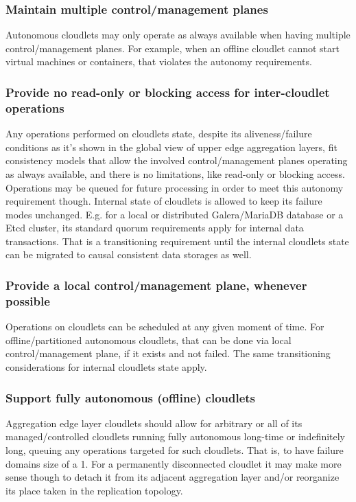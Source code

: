 \documentclass[conference]{IEEEtran}
\begin{document}
\subsubsection{Maintain multiple control/management planes}
Autonomous cloudlets may only operate as always available when having multiple
control/management planes. For example, when an offline cloudlet cannot start
virtual machines or containers, that violates the autonomy requirements.

\subsubsection{Provide no read-only or blocking access for inter-cloudlet
operations}
Any operations performed on cloudlets state, despite its aliveness/failure
conditions as it's shown in the global view of upper edge aggregation layers,
fit consistency models that allow the involved control/management planes
operating as always available, and there is no limitations, like read-only or
blocking access. Operations may be queued for future processing in order to
meet this autonomy requirement though. Internal state of cloudlets is allowed
to keep its failure modes unchanged. E.g. for a local or distributed
Galera/MariaDB database or a Etcd cluster, its standard quorum requirements
apply for internal data transactions. That is a transitioning requirement until
the internal cloudlets state can be migrated to causal consistent data storages
as well.

\subsubsection{Provide a local control/management plane, whenever possible}
Operations on cloudlets can be scheduled at any given moment of time. For
offline/partitioned autonomous cloudlets, that can be done via local
control/management plane, if it exists and not failed. The same transitioning
considerations for internal cloudlets state apply.

\subsubsection{Support fully autonomous (offline) cloudlets}
Aggregation edge layer cloudlets should allow for arbitrary or all of its
managed/controlled cloudlets running fully autonomous long-time or indefinitely
long, queuing any operations targeted for such cloudlets. That is, to have
failure domains size of a 1. For a permanently disconnected cloudlet it may make
more sense though to detach it from its adjacent aggregation layer and/or
reorganize its place taken in the replication topology.
\end{document}

